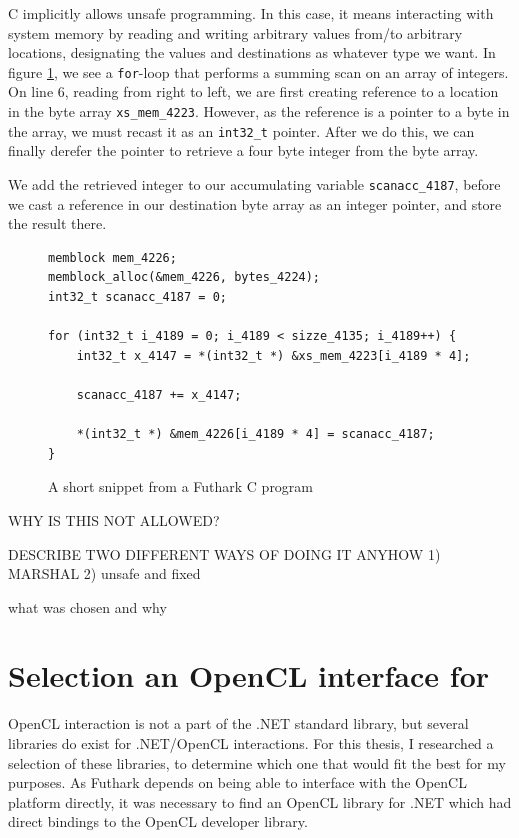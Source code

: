 C implicitly allows unsafe programming. In this case, it means interacting with system
memory by reading and writing arbitrary values from/to arbitrary locations,
designating the values and destinations as whatever type we want.
In figure \ref{fig:futharkcscene}, we see a \texttt{for}-loop that
performs a summing scan on an array of integers.
On line 6, reading from right to left, we are first creating reference to
a location in the byte array \texttt{xs\_mem\_4223}. However, as the reference
is a pointer to a byte in the array, we must recast it as an \texttt{int32\_t} pointer.
After we do this, we can finally derefer the pointer to retrieve a four byte
integer from the byte array.

We add the retrieved integer to our accumulating variable
\texttt{scanacc\_4187}, before we cast a reference in our destination byte array
as an integer pointer, and store the result there.

\begin{figure}
\centering
\begin{verbatim}
memblock mem_4226;
memblock_alloc(&mem_4226, bytes_4224);
int32_t scanacc_4187 = 0;

for (int32_t i_4189 = 0; i_4189 < sizze_4135; i_4189++) {
    int32_t x_4147 = *(int32_t *) &xs_mem_4223[i_4189 * 4];
    
    scanacc_4187 += x_4147;

    *(int32_t *) &mem_4226[i_4189 * 4] = scanacc_4187;
}
\end{verbatim}
\caption{A short snippet from a Futhark C program}
\label{fig:futharkcscene}
\end{figure}

WHY IS THIS NOT ALLOWED?

DESCRIBE TWO DIFFERENT WAYS OF DOING IT ANYHOW
1) MARSHAL
2) unsafe and fixed

what was chosen and why



\section*{Selection an OpenCL interface for \csharp{}}
OpenCL interaction is not a part of the .NET standard library, but several
libraries do exist for .NET/OpenCL interactions. For this thesis, I researched a
selection of these libraries, to determine which one that would fit the best for
my purposes.
As Futhark depends on being able to interface with the OpenCL platform directly,
it was necessary to find an OpenCL library for .NET which had direct bindings to
the OpenCL developer library.

